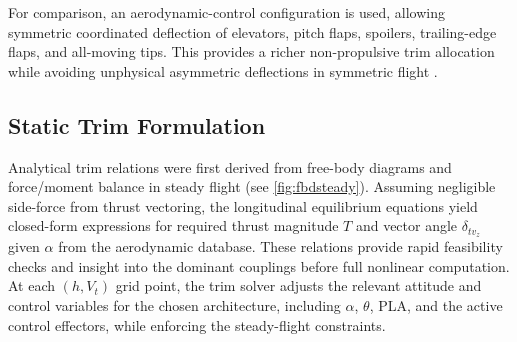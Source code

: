 \documentclass[conf]{new-aiaa}
\begin{document}
For comparison, an aerodynamic-control configuration is used, allowing symmetric coordinated deflection of elevators, pitch flaps, spoilers, trailing-edge flaps, and all-moving tips. This provides a richer non-propulsive trim allocation while avoiding unphysical asymmetric deflections in symmetric flight \cite{Buffington1999}.

\subsection{Static Trim Formulation}
Analytical trim relations were first derived from free-body diagrams and force/moment balance in steady flight (see \autoref{fig:fbdsteady}). Assuming negligible side-force from thrust vectoring, the longitudinal equilibrium equations yield closed-form expressions for required thrust magnitude $T$ and vector angle $\delta_{tv_z}$ given $\alpha$ from the aerodynamic database. These relations provide rapid feasibility checks and insight into the dominant couplings before full nonlinear computation. At each $(h,V_t)$ grid point, the trim solver adjusts the relevant attitude and control variables for the chosen architecture, including $\alpha$, $\theta$, PLA, and the active control effectors, while enforcing the steady-flight constraints.
\end{document}
